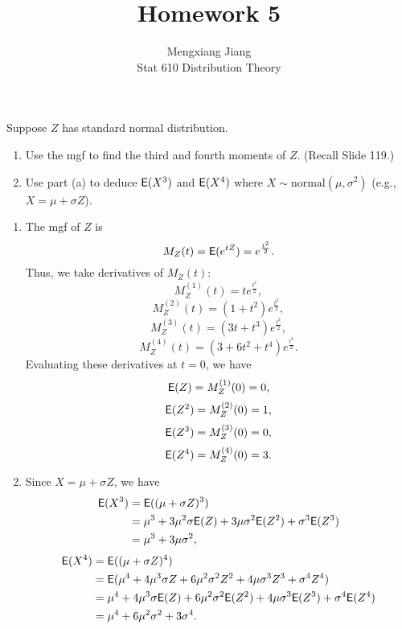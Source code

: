 \documentclass[12pt]{article}
\newcommand{\E}{{\sf E}}
\newenvironment{problem}[2][Problem]{\begin{trivlist}
\item[\hskip \labelsep {\bfseries #1}\hskip \labelsep {\bfseries #2.}]}
{\end{trivlist}}
\begin{document}
 
 
\title{Homework 5}%
\author{Mengxiang Jiang\\ %
Stat 610 Distribution Theory} %
 
\maketitle

\begin{problem}{1}
  Suppose $Z$ has standard normal distribution.
  \begin{enumerate}
    \item Use the mgf to find the third and fourth moments of $Z$. 
    (Recall Slide 119.)
    \item Use part (a) to deduce $\E(X^3)$ and $\E(X^4)$ where 
    $X \sim \text{normal}(\mu, \sigma^2)$ (e.g., $X = \mu + \sigma Z$).
  \end{enumerate}
  
  \begin{enumerate}
    \item The mgf of $Z$ is
    \[
      M_Z(t) = \E(e^{tZ}) = e^{\frac{t^2}{2}}.
    \]
    Thus, we take derivatives of $M_Z(t)$:
    \[
      M_Z^{(1)}(t) = t e^{\frac{t^2}{2}},
    \]
    \[
      M_Z^{(2)}(t) = (1 + t^2) e^{\frac{t^2}{2}},
    \]
    \[
      M_Z^{(3)}(t) = (3t + t^3) e^{\frac{t^2}{2}},
    \]
    \[
      M_Z^{(4)}(t) = (3 + 6t^2 + t^4) e^{\frac{t^2}{2}}.
    \]
    Evaluating these derivatives at $t = 0$, we have
    \[
      \E(Z) = M_Z^{(1)}(0) = 0,
    \]
    \[
      \E(Z^2) = M_Z^{(2)}(0) = 1,
    \]
    \[
      \E(Z^3) = M_Z^{(3)}(0) = 0,
    \]
    \[
      \E(Z^4) = M_Z^{(4)}(0) = 3.
    \]
    \item Since $X = \mu + \sigma Z$, we have
    \[
      \begin{aligned}
      \E(X^3) &= \E((\mu + \sigma Z)^3) \\
      &= \mu^3 + 3\mu^2\sigma \E(Z) + 3\mu\sigma^2 \E(Z^2) + \sigma^3 \E(Z^3) \\
      &= \mu^3 + 3\mu\sigma^2,
      \end{aligned}
    \]
    \[
      \begin{aligned}
        \E(X^4) &= \E((\mu + \sigma Z)^4) \\
        &= \E(\mu^4 + 4\mu^3\sigma Z + 6\mu^2\sigma^2 Z^2 
        + 4\mu\sigma^3 Z^3 + \sigma^4 Z^4) \\
        &= \mu^4 + 4\mu^3\sigma \E(Z) + 6\mu^2\sigma^2 \E(Z^2) 
        + 4\mu\sigma^3 \E(Z^3) + \sigma^4 \E(Z^4) \\
        &= \mu^4 + 6\mu^2\sigma^2 + 3\sigma^4.
      \end{aligned}
    \]
  \end{enumerate}
\end{problem}
\end{document}
